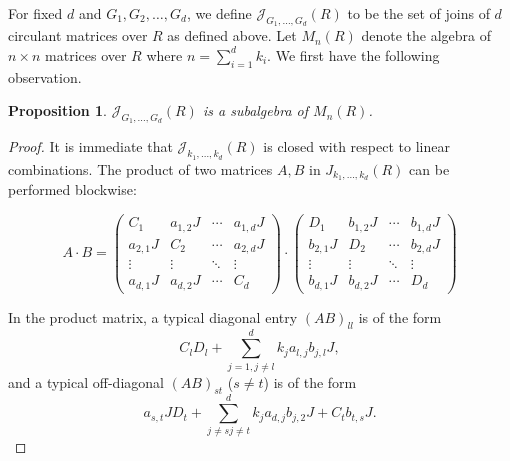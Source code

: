 \documentclass[12pt, a4paper]{amsart}
\numberwithin{equation}{section} %
\theoremstyle{plain}
\theoremstyle{definition}
\theoremstyle{plain}
\newtheorem{prop}[thm]{Proposition}
\theoremstyle{remark}
\newcommand{\ones}{J}
\newcommand{\sJ}{\mathcal{J}}
\begin{document}
For fixed $d$ and $G_1, G_2, \ldots, G_d$, we define $\sJ_{G_1,\dots,G_d}(R)$ to be the set of joins of $d$ circulant matrices over $R$ as defined above. 
Let $M_n(R)$ denote the algebra of $n\times n$ matrices over $R$ where $n=\sum_{i=1}^d k_i$. We first have the following observation. 
\begin{prop}
$\mathcal{J}_{G_1,\dots,G_d}(R)$ is a subalgebra of $M_n(R)$.
\end{prop}
\begin{proof}
It is immediate that $\mathcal{J}_{k_1,\dots,k_d}(R)$ is closed with respect to linear combinations. The product of two matrices $A,B$ in $J_{k_1,\dots,k_d}(R)$ can be performed blockwise: 


\begin{equation}\label{eq:product}
A\cdot B=\left(\begin{array}{c|c|c|c}
C_1 & a_{1,2}\ones & \cdots & a_{1,d}\ones \\
\hline
a_{2,1}\ones & C_2 & \cdots & a_{2,d}\ones \\
\hline
\vdots & \vdots & \ddots & \vdots \\
\hline
a_{d,1}\ones & a_{d,2}\ones & \cdots & C_d
\end{array}\right)
\cdot
\left(\begin{array}{c|c|c|c}
D_1 & b_{1,2}\ones & \cdots & b_{1,d}\ones \\
\hline
b_{2,1}\ones & D_2 & \cdots & b_{2,d}\ones \\
\hline
\vdots & \vdots & \ddots & \vdots \\
\hline
b_{d,1}\ones & b_{d,2}\ones & \cdots & D_d
\end{array}\right)
\end{equation}

In the product matrix, a typical  diagonal entry $(AB)_{ll}$  is of the form
\[C_l D_l +\sum_{j=1,j\neq l}^dk_ja_{l,j}b_{j,l}\ones,\] and a typical off-diagonal $(AB)_{st}$ ($s\ne t $) is of the form 
\[a_{s,t}\ones D_t+\sum_{j \neq s j\neq t}^{d}k_ja_{d,j}b_{j,2}\ones+C_t b_{t,s}\ones.
\]



\end{proof}
\end{document}
